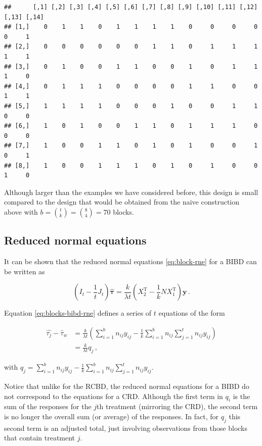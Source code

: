 \documentclass[
]{book}
\theoremstyle{definition}
\theoremstyle{definition}
\theoremstyle{definition}
\theoremstyle{definition}
\theoremstyle{remark}
\begin{document}
\begin{verbatim}
##      [,1] [,2] [,3] [,4] [,5] [,6] [,7] [,8] [,9] [,10] [,11] [,12] [,13] [,14]
## [1,]    0    1    1    0    1    1    1    1    0     0     0     0     0     1
## [2,]    0    0    0    0    0    0    1    1    0     1     1     1     1     1
## [3,]    0    1    0    0    1    1    0    0    1     0     1     1     1     0
## [4,]    0    1    1    1    0    0    0    0    1     1     0     0     1     1
## [5,]    1    1    1    1    0    0    0    1    0     0     1     1     0     0
## [6,]    1    0    1    0    0    1    1    0    1     1     1     0     0     0
## [7,]    1    0    0    1    1    0    1    0    1     0     0     1     0     1
## [8,]    1    0    0    1    1    1    0    1    0     1     0     0     1     0
\end{verbatim}

Although larger than the examples we have considered before, this design is small compared to the design that would be obtained from the naive construction above with \(b = {t \choose k} = {8 \choose 4} = 70\) blocks.

\hypertarget{reduced-normal-equations}{%
\subsection{Reduced normal equations}\label{reduced-normal-equations}}

It can be shown that the reduced normal equations \eqref{eq:block-rne} for a BIBD can be written as

\begin{equation}
\left(I_t - \frac{1}{t}J_t\right)\hat{\boldsymbol{\tau}} = \frac{k}{\lambda t}\left(X_2^{\mathrm{T}} - \frac{1}{k}NX_1^{\mathrm{T}}\right)\boldsymbol{y}\,.
\label{eq:blocks-bibd-rne}
\end{equation}

Equation \eqref{eq:blocks-bibd-rne} defines a series of \(t\) equations of the form

\begin{align*}
\hat{\tau_j} - \hat{\tau}_w & = \frac{k}{\lambda t}\left(\sum_{i = 1}^b n_{ij}y_{ij} - \frac{1}{k}\sum_{i=1}^bn_{ij}\sum_{j=1}^tn_{ij}y_{ij}\right) \\
& = \frac{k}{\lambda t} q_j\,,
\end{align*}

with \(q_j = \sum_{i = 1}^b n_{ij}y_{ij} - \frac{1}{k}\sum_{i=1}^bn_{ij}\sum_{j=1}^tn_{ij}y_{ij}\).

Notice that unlike for the RCBD, the reduced normal equations for a BIBD do not correspond to the equations for a CRD. Although the first term in \(q_i\) is the sum of the responses for the \(j\)th treatment (mirroring the CRD), the second term is no longer the overall sum (or average) of the responses. In fact, for \(q_j\) this second term is an adjusted total, just involving observations from those blocks that contain treatment \(j\).
\end{document}
